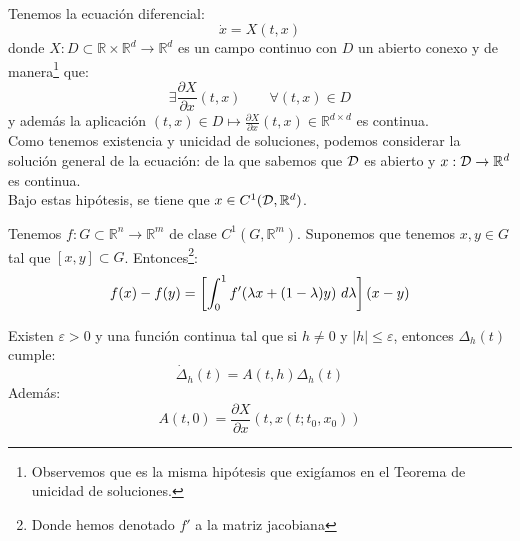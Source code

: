 \documentclass[12pt]{book}
\begin{document}
\begin{teo}\label{teo:dif_cond}~\\
    \noindent
    Tenemos la ecuación diferencial:
    \begin{equation*}
        \dot{x} = X(t,x)
    \end{equation*}
    donde $X:D\subset\mathbb{R}\times\mathbb{R}^d\to \mathbb{R}^d$ es un campo continuo con $D$ un abierto conexo y de manera\footnote{Observemos que es la misma hipótesis que exigíamos en el Teorema de unicidad de soluciones.} que:
    \begin{equation*}
        \exists \frac{\partial X}{\partial x}(t,x) \qquad \forall (t,x)\in D
    \end{equation*}
    y además la aplicación $(t,x)\in D\longmapsto \frac{\partial X}{\partial x}(t,x)\in \mathbb{R}^{d\times d}$ es continua.\\

    \noindent
    Como tenemos existencia y unicidad de soluciones, podemos considerar la solución general de la ecuación:
    de la que sabemos que $\mathcal{D}$ es abierto y $x:\mathcal{D}\to\mathbb{R}^d$ es continua.\\

    \noindent
    Bajo estas hipótesis, se tiene que $x\in C^1(\mathcal{D},\mathbb{R}^d)$.
\end{teo}


\begin{teo}
Tenemos $f:G\subset\mathbb{R}^n\to\mathbb{R}^m$ de clase $C^1(G,\mathbb{R}^m)$. Suponemos que tenemos $x,y\in G$ tal que $[x,y]\subset G$. Entonces\footnote{Donde hemos denotado $f'$ a la matriz jacobiana}:
\begin{equation*}
    f(x) - f(y) = \left[\int_{0}^{1} f'(\lambda x +(1-\lambda)y)~d\lambda \right](x-y)
\end{equation*}
\end{teo}

\begin{lema}\label{lema:1ddir}
    Existen $\varepsilon>0$ y una función continua 
    tal que si $h\neq 0$ y $|h|\leq \varepsilon$, entonces $\Delta_h(t)$ cumple:
    \begin{equation*}
        \dot{\Delta}_h(t) = A(t,h)\Delta_h(t)
    \end{equation*}
    Además:
    \begin{equation*}
        A(t,0) = \frac{\partial X}{\partial x}(t,x(t;t_0,x_0))
    \end{equation*}
\end{lema}
\end{document}
